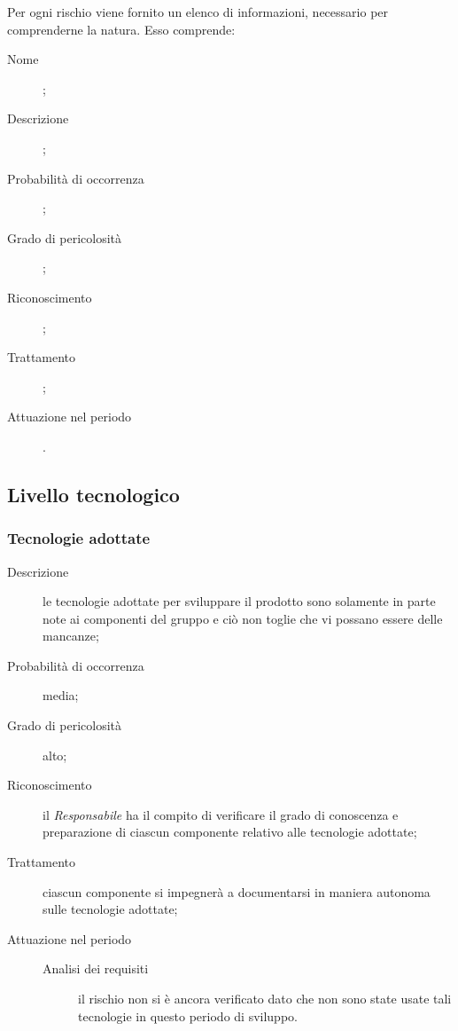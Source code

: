 Per ogni rischio viene fornito un elenco di informazioni, necessario per comprenderne la natura. Esso comprende:
\begin{description}
	\item[Nome];
	\item[Descrizione];
	\item[Probabilità di occorrenza];
	\item[Grado di pericolosità];
	\item[Riconoscimento];
	\item[Trattamento];
	\item[Attuazione nel periodo].
\end{description}
	\subsection{Livello tecnologico} \label{sec:tec}
		\subsubsection{Tecnologie adottate}
		\begin{description}
			\item[Descrizione] le tecnologie adottate per sviluppare il prodotto sono solamente in parte note ai componenti del gruppo e ciò non toglie che vi possano essere delle mancanze;
			\item[Probabilità di occorrenza] media;
			\item[Grado di pericolosità] alto;
			\item[Riconoscimento] il \emph{Responsabile} ha il compito di verificare il grado di conoscenza e preparazione di ciascun componente relativo alle tecnologie adottate;
			\item[Trattamento] ciascun componente si impegnerà a documentarsi in maniera autonoma sulle tecnologie adottate;
			\item[Attuazione nel periodo]
			\begin{description}
				\item[Analisi dei requisiti] il rischio non si è ancora verificato dato che non sono state usate tali tecnologie in questo periodo di sviluppo.
			\end{description}
		\end{description}
